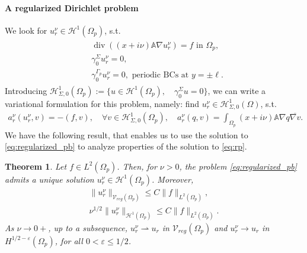 \documentclass[report]{elsarticle}
\newtheorem{theorem}{Theorem}[section]
\numberwithin{theorem}{section}
\newcommand{\re}{\varepsilon}
\begin{document}
\paragraph{A regularized Dirichlet problem} We look for $u^{\nu}_r\in \mathcal{H}^1(\Omega_p)$, s.t. 
\begin{align}
	\label{eq:regularized_pb}
	\begin{split}
		&\operatorname{div}((x+i\nu)\mathbb{A}\nabla u^{\nu}_r)=f \text{ in }\Omega_p,\\
		&\gamma_0^{\Sigma} u^{\nu}_r=0,\\
		&\gamma_0^{\Gamma_p}u^{\nu}_r =0, \text{ periodic BCs at }y=\pm\ell.
	\end{split}
\end{align}
Introducing $\mathcal{H}^1_{\Sigma,0}(\Omega_p):=\{u\in \mathcal{H}^1(\Omega_p), \quad \gamma_0^{\Sigma}u=0\}$, we 
can write a variational formulation for this problem, namely: find $u_r^{\nu}\in \mathcal{H}^{1}_{\Sigma,0}(\Omega)$, s.t.  
\begin{align}
	\label{eq:anur}
	a_r^{\nu}(u^{\nu}_r, v)=-(f, v), \quad \forall v\in \mathcal{H}^1_{\Sigma,0}(\Omega_p), \quad a_r^{\nu}(q,v)=\int_{\Omega_p}(x+i\nu)\mathbb{A}\nabla q\overline{\nabla v}. 
\end{align}
We have the following result, that enables us to use the solution to \eqref{eq:regularized_pb} to analyze properties of the solution to \eqref{eq:rp}. 
\begin{theorem}
	\label{theorem:convergenceNeumann}
	Let $f\in L^2(\Omega_p)$. 
	Then, for $\nu>0$, the problem \eqref{eq:regularized_pb} admits a unique solution $u^{\nu}_r\in \mathcal{H}^1(\Omega_p)$. Moreover, \begin{align}
		\label{eq:vreg}
		\|u^{\nu}_r\|_{\mathcal{V}_{reg}(\Omega_p)}\leq C\|f\|_{L^2(\Omega_p)},\\
		\label{eq:vreg2}
		\nu^{1/2}	\|u^{\nu}_r\|_{\mathcal{H}^1(\Omega_p)}\leq C\|f\|_{L^2(\Omega_p)}.
	\end{align}
	As $\nu\rightarrow 0+$, up to a subsequence, $u^{\nu}_r\rightharpoonup u_r$ in $\mathcal{V}_{reg}(\Omega_p)$ and $u^{\nu}_r\rightarrow u_r$ in $H^{1/2-\re}(\Omega_p)$, for all $0<\re\leq 1/2$.  
\end{theorem}
\end{document}
